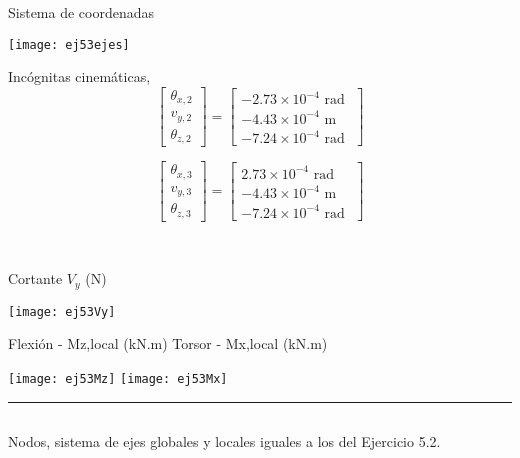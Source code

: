 Sistema de coordenadas
\begin{center}
	\texttt{[image: ej53ejes]}
\end{center}




\begin{minipage}{0.45\textwidth}
	Incógnitas cinemáticas,
	$$
	\left[
	\begin{matrix}
	\theta_{x,2} \\
	v_{y,2} \\
	\theta_{z,2}
	\end{matrix}
	\right]
	=
	\left[
	\begin{matrix}
	-2.73\times 10^{-4} \text{ rad }\\
	-4.43\times 10^{-4} \text{ m }\\
	-7.24\times 10^{-4} \text{ rad }
	\end{matrix}
	\right]
	$$
	
	$$
	\left[
	\begin{matrix}
	\theta_{x,3} \\
	v_{y,3} \\
	\theta_{z,3}
	\end{matrix}
	\right]
	=
	\left[
	\begin{matrix}
	2.73\times 10^{-4} \text{ rad }\\
	-4.43\times 10^{-4} \text{ m }\\
	-7.24\times 10^{-4} \text{ rad }
	\end{matrix}
	\right]
	$$
\end{minipage}
~
\begin{minipage}{0.45\textwidth}
	Cortante $V_y$ (N)
	
	\texttt{[image: ej53Vy]}
\end{minipage}


Flexión - Mz,local (kN.m) \hfill  Torsor - Mx,local (kN.m)

\texttt{[image: ej53Mz]}
\texttt{[image: ej53Mx]}


\hrule 

\subsection{}

Nodos, sistema de ejes globales y locales iguales a los del Ejercicio 5.2.



